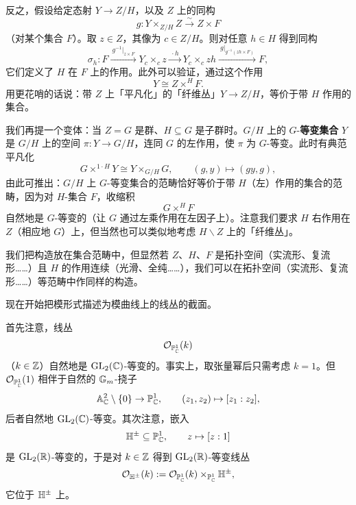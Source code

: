 反之，假设给定态射 $Y\to Z/H$，以及 $Z$ 上的同构
\[
g:Y\times_{Z/H}Z\xrightarrow{\ \sim\ }Z\times F
\]
（对某个集合 $F$）。取 $z\in Z$，其像为 $c\in Z/H$。则对任意 $h\in H$ 得到同构
\[
\sigma_h:F\xrightarrow{\ g^{-1}|_{z\times F}\ }Y_c\times_cz\xrightarrow{\ \cdot h\ }Y_c\times_czh\xrightarrow{\ g|_{g^{-1}(zh\times F)}\ }F,
\]
它们定义了 $H$ 在 $F$ 上的作用。此外可以验证，通过这个作用
\[
Y\cong Z\times^HF.
\]
用更花哨的话说：带 $Z$ 上「平凡化」的「纤维丛」$Y\to Z/H$，等价于带 $H$ 作用的集合。

我们再提一个变体：当 $Z=G$ 是群、$H\subseteq G$ 是子群时。$G/H$ 上的 $G$-\textbf{等变集合} $Y$ 是 $G/H$ 上的空间 $\pi:Y\to G/H$，连同 $G$ 的左作用，使 $\pi$ 为 $G$-等变。此时有典范平凡化
\[
G\times^{1\cdot H}Y\cong Y\times_{G/H}G,\qquad(g,y)\mapsto(gy,g),
\]
由此可推出：$G/H$ 上 $G$-等变集合的范畴恰好等价于带 $H$（左）作用的集合的范畴，因为对 $H$-集合 $F$，收缩积
\[
G\times^HF
\]
自然地是 $G$-等变的（让 $G$ 通过左乘作用在左因子上）。注意我们要求 $H$ 右作用在 $Z$（相应地 $G$）上，但当然也可以类似地考虑 $H\backslash Z$ 上的「纤维丛」。

我们把构造放在集合范畴中，但显然若 $Z$、$H$、$F$ 是拓扑空间（实流形、复流形……）且 $H$ 的作用连续（光滑、全纯……），我们可以在拓扑空间（实流形、复流形……）等范畴中作同样的构造。

现在开始把模形式描述为模曲线上的线丛的截面。

首先注意，线丛
\[
\mathcal{O}_{\mathbb{P}^1_{\mathbb{C}}}(k)
\]
（$k\in\mathbb{Z}$）自然地是 $\operatorname{GL}_2(\mathbb{C})$-等变的。事实上，取张量幂后只需考虑 $k=1$。但 $\mathcal{O}_{\mathbb{P}^1_{\mathbb{C}}}(1)$ 相伴于自然的 $\mathbb{G}_m$-挠子
\[
\mathbb{A}^2_{\mathbb{C}}\setminus\{0\}\to\mathbb{P}^1_{\mathbb{C}},\qquad(z_1,z_2)\mapsto[z_1:z_2],
\]
后者自然地 $\operatorname{GL}_2(\mathbb{C})$-等变。其次注意，嵌入
\[
\mathbb{H}^\pm\subseteq\mathbb{P}^1_{\mathbb{C}},\qquad z\mapsto[z:1]
\]
是 $\operatorname{GL}_2(\mathbb{R})$-等变的，于是对 $k\in\mathbb{Z}$ 得到 $\operatorname{GL}_2(\mathbb{R})$-等变线丛
\[
\mathcal{O}_{\mathbb{H}^\pm}(k):=\mathcal{O}_{\mathbb{P}^1_{\mathbb{C}}}(k)\times_{\mathbb{P}^1_{\mathbb{C}}}\mathbb{H}^\pm,
\]
它位于 $\mathbb{H}^\pm$ 上。

